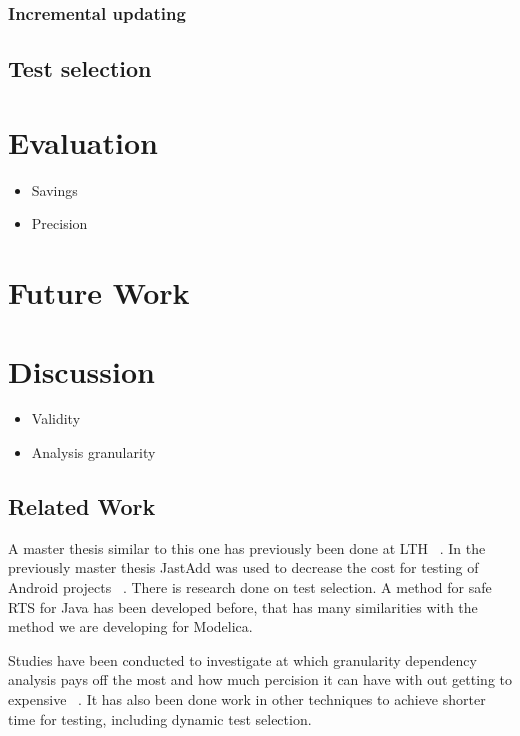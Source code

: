 \documentclass{cslthse-msc}
\begin{document}
\subsection{Incremental updating}

\section{Test selection}

\chapter[Evaluation]{Evaluation}
\begin{itemize}
	\item Savings
	\item Precision
\end{itemize}

\chapter[Future Work]{Future Work}

\chapter[Discussion]{Discussion}


\begin{itemize}
	\item Validity
	\item Analysis granularity
\end{itemize}

\section{Related Work}
A master thesis similar to this one has previously been done at LTH ~\cite{kampe2012dependroid}. In the previously master thesis JastAdd was used to decrease the cost for testing of Android projects ~\cite{DUMMY}. There is research done on test selection. A method for safe RTS for Java has been developed before, that has many similarities with the method we are developing for Modelica. 

Studies have been conducted to investigate at which granularity dependency analysis pays off the most and how much percision it can have with out getting to expensive ~\cite{DBLP:conf/sigsoft/LegunsenHSLZM16}. It has also been done work in other techniques to achieve shorter time for testing, including dynamic test selection.
\end{document}
